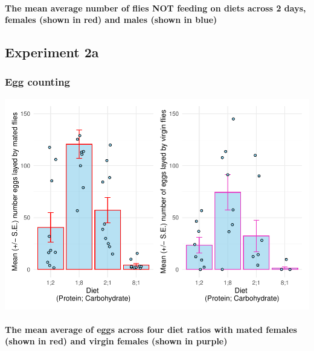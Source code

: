 \documentclass[
]{article}
\begin{document}
\hypertarget{the-mean-average-number-of-flies-not-feeding-on-diets-across-2-days-females-shown-in-red-and-males-shown-in-blue}{%
\paragraph{The mean average number of flies NOT feeding on diets across
2 days, females (shown in red) and males (shown in
blue)}\label{the-mean-average-number-of-flies-not-feeding-on-diets-across-2-days-females-shown-in-red-and-males-shown-in-blue}}

\hypertarget{experiment-2a}{%
\subsection{Experiment 2a}\label{experiment-2a}}

\hypertarget{egg-counting-1}{%
\subsubsection{Egg counting}\label{egg-counting-1}}

\includegraphics{Drosophila-project_files/figure-latex/unnamed-chunk-5-1.pdf}

\hypertarget{the-mean-average-of-eggs-across-four-diet-ratios-with-mated-females-shown-in-red-and-virgin-females-shown-in-purple}{%
\paragraph{The mean average of eggs across four diet ratios with mated
females (shown in red) and virgin females (shown in
purple)}\label{the-mean-average-of-eggs-across-four-diet-ratios-with-mated-females-shown-in-red-and-virgin-females-shown-in-purple}}
\end{document}
